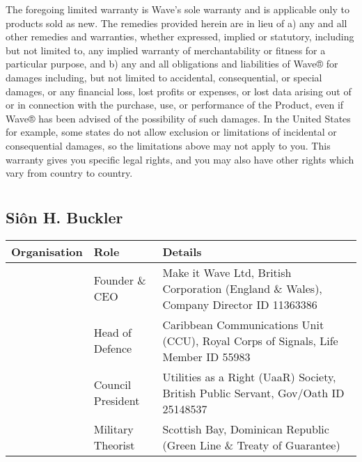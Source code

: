 \documentclass[letterpaper,10pt,openany,oneside,english]{sphinxmanual}
\begin{document}
The foregoing limited warranty is Wave’s sole warranty and is applicable only to products sold as new. The remedies provided herein are in lieu of a) any and all other remedies and warranties, whether expressed, implied or statutory, including but not limited to, any implied warranty of merchantability or fitness for a particular purpose, and b) any and all obligations and liabilities of Wave® for damages including, but not limited to accidental, consequential, or special damages, or any financial loss, lost profits or expenses, or lost data arising out of or in connection with the purchase, use, or performance of the Product, even if Wave® has been advised of the possibility of such damages. In the United States for example, some states do not allow exclusion or limitations of incidental or consequential damages, so the limitations above may not apply to you. This warranty gives you specific legal rights, and you may also have other rights which vary from country to country.


\chapter{}
\label{\detokenize{index:document-author-s}}

\section{Siôn H. Buckler}
\label{\detokenize{index:sion-h-buckler}}

\begin{savenotes}\sphinxattablestart
\centering
\begin{tabulary}{\linewidth}[t]{|T|T|T|}
\hline
\sphinxstyletheadfamily 
Organisation
&\sphinxstyletheadfamily 
Role
&\sphinxstyletheadfamily 
Details
\\
\hline
\noindent{}
&
Founder \& CEO
&
Make it Wave Ltd, British Corporation (England \& Wales), Company Director ID 11363386
\\
\hline
\noindent{}
&
Head of Defence
&
Caribbean Communications Unit (CCU), Royal Corps of Signals, Life Member ID 55983
\\
\hline
\noindent{}
&
Council President
&
Utilities as a Right (UaaR) Society, British Public Servant, Gov/Oath ID 25148537
\\
\hline
\noindent{}
&
Military Theorist
&
Scottish Bay, Dominican Republic (Green Line \& Treaty of Guarantee)
\\
\hline
\end{tabulary}
\par
\sphinxattableend\end{savenotes}
\end{document}
